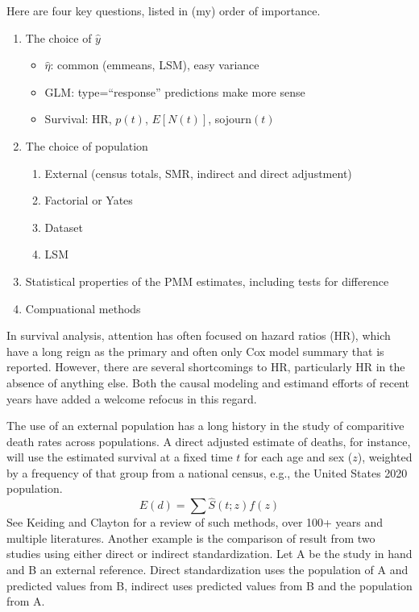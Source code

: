 \documentclass{article}\usepackage[]{graphicx}\usepackage[]{xcolor}
\begin{document}
Here are four key questions, listed in (my) order of importance.
\begin{enumerate}
  \item The choice of $\hat y$
    \begin{itemize}
      \item $\hat \eta$: common (emmeans, LSM), easy variance
      \item GLM: type=``response'' predictions make more sense
      \item Survival: HR, $p(t)$, $E[N(t)]$, sojourn$(t)$
    \end{itemize}
  \item The choice of population
    \begin{enumerate}
      \item External (census totals, SMR, indirect and direct adjustment)
      \item Factorial or Yates
      \item Dataset
      \item LSM
    \end{enumerate}       
  \item Statistical properties of the PMM estimates, including tests for
    difference 
  \item Compuational methods
\end{enumerate}

In survival analysis, attention has often focused on hazard ratios (HR),
which have a long reign as the primary and often only Cox model summary 
that is reported.
However, there are several shortcomings to HR,
particularly HR in the absence of anything else. 
Both the causal modeling and estimand efforts of recent years have added
a welcome refocus in this regard.


The use of an external population has a long history in the study of comparitive
death rates across populations. 
A direct adjusted estimate of deaths, for instance, will use the estimated
survival at a fixed time $t$ for each age and sex ($z$), weighted by a 
frequency of that group from a national census, e.g., the United States 2020
population.
\begin{equation*}
  E(d) = \sum \hat S(t; z) f(z)
\end{equation*}
See Keiding and Clayton \cite{Keiding14} for a review of such methods,
over 100+ years and multiple literatures.
Another example is the comparison of result from two studies using either
direct or indirect standardization.  Let A be the study in hand and B an
external reference.  Direct standardization uses the population of A and 
predicted values from B, indirect uses predicted values from B and the population
from A.
\end{document}

